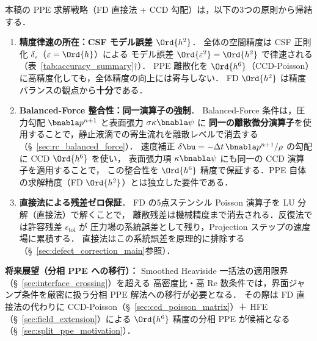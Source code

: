 \begin{tcolorbox}[mybox, title={設計選択の根拠：なぜ FD（$\Ord{h^2}$）で PPE を解き，CCD（$\Ord{h^6}$）で速度補正するのか}]
\label{box:ppe_design_rationale}
本稿の PPE 求解戦略（FD 直接法 + CCD 勾配）は，以下の3つの原則から帰結する．

\begin{enumerate}
  \item \textbf{精度律速の所在：CSF モデル誤差 $\Ord{h^2}$}．
        全体の空間精度は CSF 正則化 $\delta_\varepsilon$（$\varepsilon=\Ord{h}$）による
        モデル誤差 $\Ord{\varepsilon^2}=\Ord{h^2}$ で律速される（表~\ref{tab:accuracy_summary}†）．
        PPE 離散化を $\Ord{h^6}$（CCD-Poisson）に高精度化しても，全体精度の向上には寄与しない．
        FD $\Ord{h^2}$ は精度バランスの観点から\textbf{十分}である．

  \item \textbf{Balanced-Force 整合性：同一演算子の強制}．
        Balanced-Force 条件は，圧力勾配 $\bnabla p^{n+1}$ と表面張力 $\sigma\kappa\bnabla\psi$ に
        \textbf{同一の離散微分演算子}を使用することで，静止液滴での寄生流れを離散レベルで消去する
        （§~\ref{sec:rc_balanced_force}）．
        速度補正 $\delta\bu = -\Delta t\,\bnabla p^{n+1}/\rho$ の勾配に CCD $\Ord{h^6}$ を使い，
        表面張力項 $\kappa\bnabla\psi$ にも同一の CCD 演算子を適用することで，
        この整合性を $\Ord{h^6}$ 精度で保証する．PPE 自体の求解精度（FD $\Ord{h^2}$）とは独立した要件である．

  \item \textbf{直接法による残差ゼロ保証}．
        FD の5点ステンシル Poisson 演算子を LU 分解（直接法）で解くことで，
        離散残差は機械精度まで消去される．反復法では許容残差 $\epsilon_{\mathrm{tol}}$ が
        圧力場の系統誤差として残り，Projection ステップの速度場に累積する．
        直接法はこの系統誤差を原理的に排除する（§~\ref{sec:defect_correction_main}参照）．
\end{enumerate}

\noindent\textbf{将来展望（分相 PPE への移行）：}
Smoothed Heaviside 一括法の適用限界（§~\ref{sec:interface_crossing}）を超える
高密度比・高 Re 数条件では，界面ジャンプ条件を厳密に扱う分相 PPE 解法への移行が必要となる．
その際は FD 直接法の代わりに CCD-Poisson（§~\ref{sec:ccd_poisson_matrix}）＋
HFE（§~\ref{sec:field_extension}）による $\Ord{h^6}$ 精度の分相 PPE が候補となる
（§~\ref{sec:split_ppe_motivation}）．
\end{tcolorbox}

